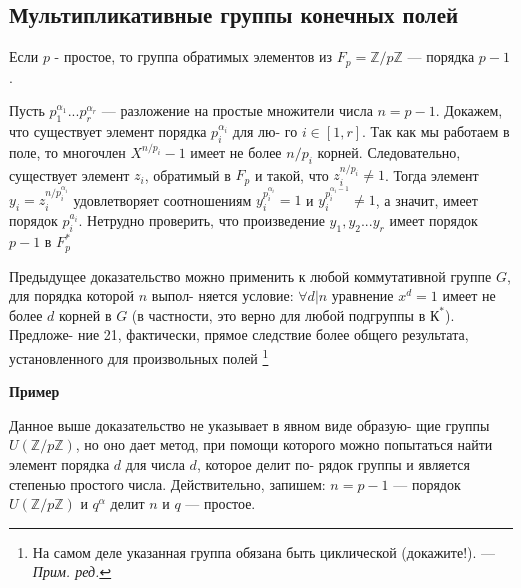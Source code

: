 \subsection{Мультипликативные группы конечных полей}
\begin{predl}
Если $p$ - простое, то группа обратимых элементов из $F_p = \mathbb{Z}/ p \mathbb{Z}$ ---\linebreak
порядка $p-1$.
\end{predl}
\begin{myproof}
Пусть $p_{1}^{\alpha_1} ...p_{r}^{\alpha_r}$ --- разложение на простые множители числа\linebreak
$n = p - 1$. Докажем, что существует элемент порядка $p_{i}^{\alpha_i}$ для лю-\linebreak
го $i \in [1, r]$. Так как мы работаем в поле, то многочлен $X^{n/p_i}-1$\linebreak
имеет не более $n/p_i$ корней. Следовательно, существует элемент $z_i$,
обратимый в $F_p$ и такой, что $z_i^{n/p_i} \ne 1$. Тогда элемент $y_i = z_i^{n/p_i^{\alpha_i}}$ удовлетворяет соотношениям $y_i^{p_i^{\alpha_i}} = 1$ и $y_i^{p_i^{\alpha_i - 1}} \ne 1$, а значит, имеет порядок $p_i^{a_i}$. Нетрудно проверить, что произведение $y_1,y_2...y_r$\linebreak
имеет порядок $p-1$ в $F_p^*$
\end{myproof}
\begin{mynotice}
Предыдущее доказательство можно применить к\linebreak
любой коммутативной группе $G$, для порядка которой $n$ выпол­-\linebreak
няется условие: $\forall d | n$ уравнение $x^d = 1$ имеет не более $d$ корней в\linebreak
$G$ (в частности, это верно для любой подгруппы в $К^*$). Предложе­-\linebreak
ние 21, фактически, прямое следствие более общего результата,\linebreak
установленного для произвольных полей
\footnote{На самом деле указанная группа обязана быть циклической (докажите!). --- \linebreak \textit{Прим. ред.}}
\end{mynotice}
\textbf{Пример}

Данное выше доказательство не указывает в явном виде образую­-\linebreak
щие группы $U(\mathbb{Z}/p\mathbb{Z})$, но оно дает метод, при помощи которого можно\linebreak
попытаться найти элемент порядка $d$ для числа $d$, которое делит по­-\linebreak
рядок группы и является степенью простого числа. Действительно,\linebreak
запишем: $n = p - 1$ — порядок $U(\mathbb{Z}/p\mathbb{Z})$ и $q^{\alpha}$ делит $n$ и $q$ — простое.\linebreak

